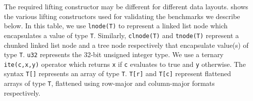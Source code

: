 The required lifting constructor may be different for different data layouts.
 shows the various lifting constructors used for validating
the benchmarks we describe below. In this table,
we use {\tt lnode(T)} to represent a linked list node
which encapsulates a value of type {\tt T}.
Similarly, {\tt clnode(T)} and {\tt tnode(T)} represent
a chunked linked list node and a tree node respectively
that encapsulate
value(s) of type {\tt T}. {\tt u32} represents
the 32-bit unsigned integer type.
We use a ternary {\tt ite(c,x,y)} operator which
returns {\tt x} if {\tt c} evaluates to true and {\tt y} otherwise.
The syntax {\tt T[]} represents an array of type {\tt T}.
{\tt T[r]} and {\tt T[c]} represent flattened
arrays of type {\tt T}, flattened using row-major and column-major
formats respectively.

